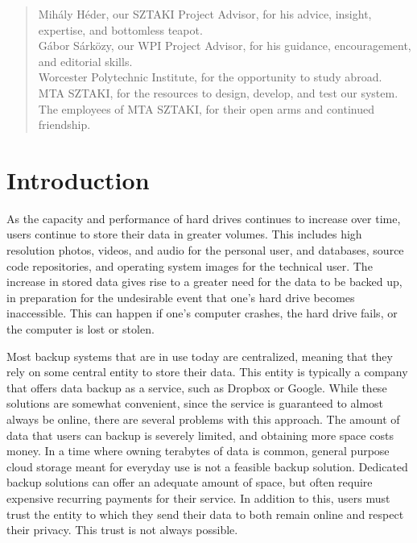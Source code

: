 \documentclass[12pt]{report}
\begin{document}
\renewcommand{\abstractname}{Acknowledgements}
\begin{abstract}
Mih\'aly H\'eder, our SZTAKI Project Advisor, for his advice, insight, expertise, and bottomless teapot.\\

\noindent G\'abor S\'ark\"ozy, our WPI Project Advisor, for his guidance, encouragement, and editorial skills. \\

\noindent Worcester Polytechnic Institute, for the opportunity to study abroad. \\

\noindent MTA SZTAKI, for the resources to design, develop, and test our system. \\

\noindent The employees of MTA SZTAKI, for their open arms and continued friendship.
\end{abstract}

\tableofcontents
\listoffigures

\chapter{Introduction}

As the capacity and performance of hard drives continues to increase over time, users continue to store their data in greater volumes. This includes high resolution photos, videos, and audio for the personal user, and databases, source code repositories, and operating system images for the technical user. The increase in stored data gives rise to a greater need for the data to be backed up, in preparation for the undesirable event that one's hard drive becomes inaccessible. This can happen if one's computer crashes, the hard drive fails, or the computer is lost or stolen.

Most backup systems that are in use today are centralized, meaning that they rely on some central entity to store their data. This entity is typically a company that offers data backup as a service, such as Dropbox or Google. While these solutions are somewhat convenient, since the service is guaranteed to almost always be online, there are several problems with this approach. The amount of data that users can backup is severely limited, and obtaining more space costs money. In a time where owning terabytes of data is common, general purpose cloud storage meant for everyday use is not a feasible backup solution. Dedicated backup solutions can offer an adequate amount of space, but often require expensive recurring payments for their service. In addition to this, users must trust the entity to which they send their data to both remain online and respect their privacy. This trust is not always possible.
\end{document}
